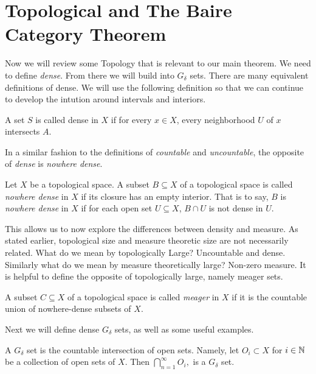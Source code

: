 \section{Topological and The Baire Category Theorem}
Now we will review some Topology that is relevant to our main theorem.  We need to define \textit{dense}.  From there we will build into $G_\delta$ sets.     There are many equivalent definitions of dense.  We will use the following definition so that we can continue to develop the intution around intervals and interiors. 

\begin{definition}[Dense]
    A set $S$ is called dense in $X$ if for every $x \in X$, every neighborhood $U$ of $x$ intersects $A$.  
\end{definition}


In a similar fashion to the definitions of \textit{countable} and \textit{uncountable}, the opposite of \textit{dense} is \textit{nowhere dense}.

\begin{definition}  Let $X$ be a topological space.  A subset $B \subseteq X$ of a topological space is called \textit{nowhere dense} in $X$ if its closure has an empty interior.  That is to say, $B$ is \textit{nowhere dense} in $X$ if for each open set $U\subseteq X$, $B\cap U$ is not dense in $U$.      
\end{definition}



This allows us to now explore the differences between density and measure.  As stated earlier, topological size and measure theoretic size are not necessarily related.  What do we mean by topologically Large? Uncountable and dense.  Similarly what do we mean by measure theoretically large?  Non-zero measure. It is helpful to define the opposite of topologically large, namely meager sets.



\begin{definition}[Meager]  A subset $C \subseteq X$ of a topological space is called \textit{meager} in $X$ if it is the countable union of nowhere-dense subsets of $X$.    
\end{definition}

Next we will define dense $G_\delta$ sets, as well as some useful examples.  
\begin{definition}
    A $G_\delta$ set is the countable intersection of open sets.  Namely, let $O_i \subset X$ for $i \in \mathbb{N}$ be a collection of open sets of $X$.  Then 
    $\bigcap_{n=1}^\infty O_i,$ is a $G_\delta$ set.  
\end{definition}

